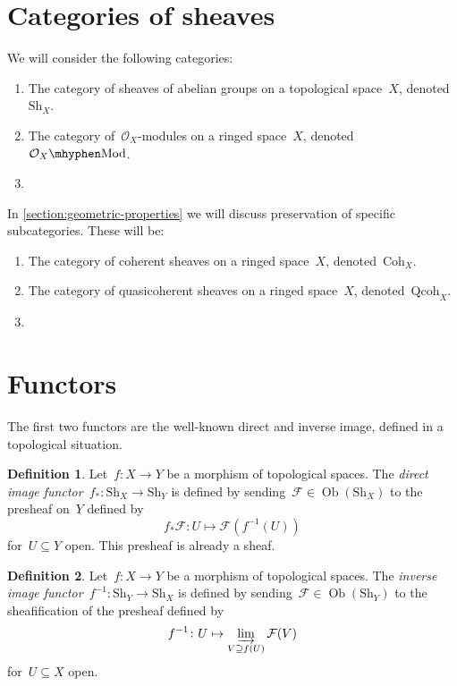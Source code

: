 \documentclass[a4paper,10pt]{article}
\theoremstyle{definition}
\newtheorem{definition}{Definition}
\newcommand\dash{\nobreakdash-\hspace{0pt}}
\newcommand\Coh{\ensuremath{\mathrm{Coh}}}
\newcommand\Qcoh{\ensuremath{\mathrm{Qcoh}}}
\newcommand\Sh{\ensuremath{\mathrm{Sh}}}
\DeclareMathOperator\Ob{Ob}
\begin{document}
\section{Categories of sheaves}
\label{section:categories}
We will consider the following categories:
\begin{enumerate}
  \item The category of sheaves of abelian groups on a topological space~$X$, denoted~$\Sh_X$.
  \item The category of~$\mathcal{O}_X$\dash modules on a ringed space~$X$, denoted~$\Mod{\mathcal{O}_X}$.
  \item {}
\end{enumerate}
In \cref{section:geometric-properties} we will discuss preservation of specific subcategories. These will be:
\begin{enumerate}
  \item The category of coherent sheaves on a ringed space~$X$, denoted~$\Coh_X$.
  \item The category of quasicoherent sheaves on a ringed space~$X$, denoted~$\Qcoh_X$.
  \item {}
\end{enumerate}

\section{Functors}
\label{section:functors}
The first two functors are the well-known direct and inverse image, defined in a topological situation.
\begin{definition}
  Let~$f\colon X\to Y$ be a morphism of topological spaces. The \emph{direct image functor}~$f_*\colon\Sh_X\to\Sh_Y$ is defined by sending~$\mathcal{F}\in\Ob(\Sh_X)$ to the presheaf on~$Y$ defined by
  \begin{equation}
    f_*\mathcal{F}\colon U\mapsto\mathcal{F}(f^{-1}(U))
    \label{equation:direct-image-abelian-groups}
  \end{equation}
  for~$U\subseteq Y$ open. This presheaf is already a sheaf.
\end{definition}

\begin{definition}
  Let~$f\colon X\to Y$ be a morphism of topological spaces. The \emph{inverse image functor}~$f^{-1}\colon\Sh_Y\to\Sh_X$ is defined by sending~$\mathcal{F}\in\Ob(\Sh_Y)$ to the sheafification of the presheaf defined by
  \begin{equation}
    f^{-1}\colon U\mapsto\varinjlim_{V\supseteq f(U)}\mathcal{F}(V)
    \label{equation:inverse-image-abelian-groups}
  \end{equation}
  for~$U\subseteq X$ open.
\end{definition}
\end{document}

